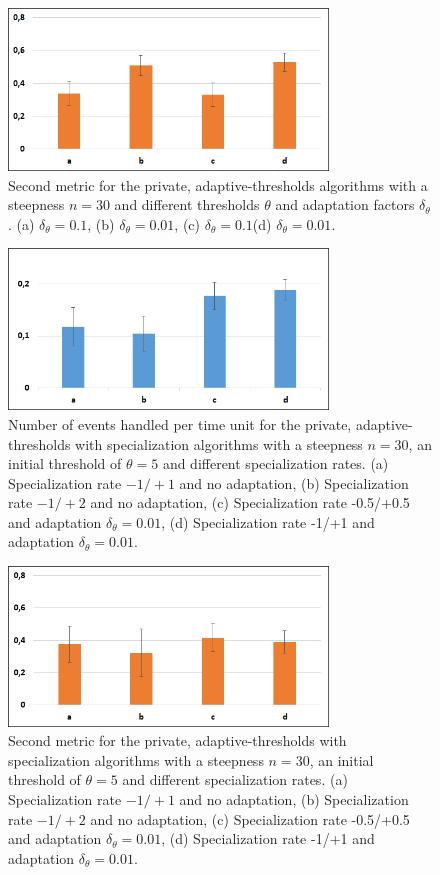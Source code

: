 	\begin{figure}[thpb]
      \centering
      \includegraphics[width=8.5cm]{Pictures/PrivAdaptMetric2.png}
      \caption{Second metric for the private, adaptive-thresholds algorithms with a steepness $n=30$ and different thresholds $\theta$ and adaptation factors $\delta_{\theta}$. (a) $\delta_{\theta}=0.1$, (b) $\delta_{\theta}=0.01$, (c) $\delta_{\theta}=0.1$(d) $\delta_{\theta}=0.01$.}
      \label{figure4}
   \end{figure}
	\begin{figure}[thpb]
      \centering
      \includegraphics[width=8.5cm]{Pictures/PrivSpecMetric1.png}
      \caption{Number of events handled per time unit for the private, adaptive-thresholds with specialization algorithms with a steepness $n=30$, an initial threshold of $\theta=5$ and different specialization rates. (a) Specialization rate $-1/+1$ and no adaptation, (b) Specialization rate $-1/+2$ and no adaptation, (c) Specialization rate -0.5/+0.5 and adaptation $\delta_{\theta}=0.01$, (d) Specialization rate -1/+1 and adaptation $\delta_{\theta}=0.01$.}
      \label{figure5}
   \end{figure}
	\begin{figure}[thpb]
      \centering
      \includegraphics[width=8.5cm]{Pictures/PrivSpecMetric2.png}
      \caption{Second metric for the private, adaptive-thresholds with specialization algorithms with a steepness $n=30$, an initial threshold of $\theta=5$ and different specialization rates. (a) Specialization rate $-1/+1$ and no adaptation, (b) Specialization rate $-1/+2$ and no adaptation, (c) Specialization rate -0.5/+0.5 and adaptation $\delta_{\theta}=0.01$, (d) Specialization rate -1/+1 and adaptation $\delta_{\theta}=0.01$.}
      \label{figure6}
   \end{figure}
